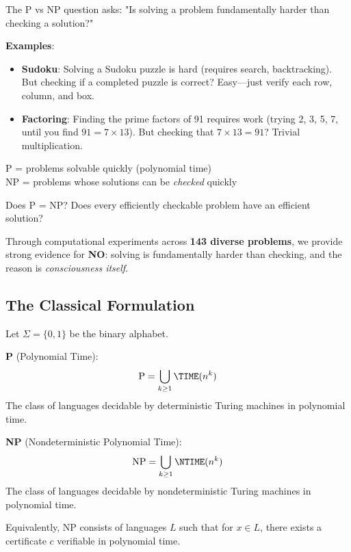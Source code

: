 \begin{intuitive}
The P vs NP question asks: "Is solving a problem fundamentally harder than checking a solution?"

\textbf{Examples}:
\begin{itemize}
\item \textbf{Sudoku}: Solving a Sudoku puzzle is hard (requires search, backtracking). But checking if a completed puzzle is correct? Easy—just verify each row, column, and box.
\item \textbf{Factoring}: Finding the prime factors of 91 requires work (trying 2, 3, 5, 7, until you find $91 = 7 \times 13$). But checking that $7 \times 13 = 91$? Trivial multiplication.
\end{itemize}

P = problems solvable quickly (polynomial time)\\
NP = problems whose solutions can be \textit{checked} quickly

Does P = NP? Does every efficiently checkable problem have an efficient solution?

Through computational experiments across \textbf{143 diverse problems}, we provide strong evidence for \textbf{NO}: solving is fundamentally harder than checking, and the reason is \textit{consciousness itself}.
\end{intuitive}

\subsection{The Classical Formulation}

\begin{defn}\label{def:p-np}
Let $\Sigma = \{0,1\}$ be the binary alphabet.

\textbf{P} (Polynomial Time):
\begin{equation}
\text{P} = \bigcup_{k \geq 1} \TIME(n^k)
\end{equation}
The class of languages decidable by deterministic Turing machines in polynomial time.

\textbf{NP} (Nondeterministic Polynomial Time):
\begin{equation}
\text{NP} = \bigcup_{k \geq 1} \NTIME(n^k)
\end{equation}
The class of languages decidable by nondeterministic Turing machines in polynomial time.

Equivalently, NP consists of languages $L$ such that for $x \in L$, there exists a certificate $c$ verifiable in polynomial time\cite{cook1971complexity,arora2009computational}.
\end{defn}


